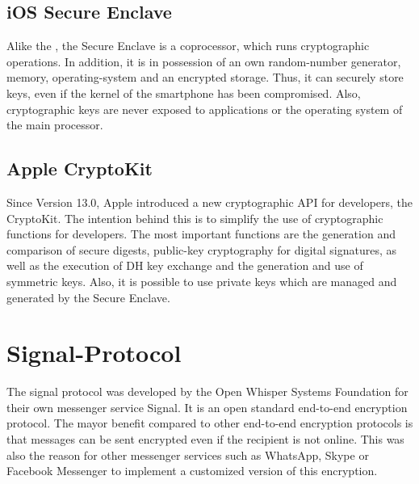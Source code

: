 \documentclass[12pt,oneside,a4paper,parskip]{scrbook}
\begin{document}

\subsection{iOS Secure Enclave}

Alike the , the Secure Enclave is a coprocessor, which runs cryptographic operations. In addition, it is in possession of an own random-number generator, memory, operating-system and an encrypted storage. Thus, it can securely store keys, even if the kernel of the smartphone has been compromised. Also, cryptographic keys are never exposed to applications or the operating system of the main processor.
\parencite{apple_storing_2020} 

\subsection{Apple CryptoKit}

Since Version 13.0, Apple introduced a new cryptographic API for developers, the CryptoKit. The intention behind this is to simplify the use of cryptographic functions for developers. The most important functions are the generation and comparison of secure digests, public-key cryptography for digital signatures, as well as the execution of DH key exchange and the generation and use of symmetric keys. Also, it is possible to use private keys which are managed and generated by the Secure Enclave.





\section{Signal-Protocol}

The signal protocol was developed by the Open Whisper Systems Foundation for their own messenger service Signal. It is an open standard end-to-end encryption protocol. The mayor benefit compared to other end-to-end encryption protocols is that messages can be sent encrypted even if the recipient is not online. This was also the reason for other messenger services such as WhatsApp, Skype or Facebook Messenger to implement a customized version of this encryption. 
\parencite{protocol_introducing_2018}
\end{document}
